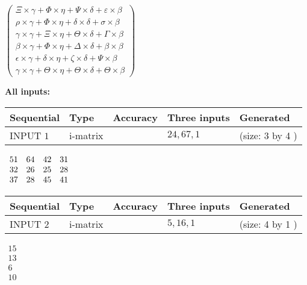 \documentclass[12pt]{article}
\begin{document}
   
 $   \left( \begin{array}
 {
 c
 }
                    \Xi \times  \gamma   +  \Phi \times  \eta   +  \Psi \times  \delta   +  \varepsilon \times  \beta \\ 
 \rho \times  \gamma   +  \Phi \times  \eta   +  \delta \times  \delta   +  \sigma \times  \beta \\ 
 \gamma \times  \gamma   +                     \Xi \times  \eta   +  \Theta \times  \delta   +  \Gamma \times  \beta \\ 
 \beta \times  \gamma   +  \Phi \times  \eta   +  \Delta \times  \delta   +  \beta \times  \beta \\ 
 \epsilon \times  \gamma   +  \delta \times  \eta   +                     \zeta \times  \delta   +  \Psi \times  \beta \\ 
 \gamma \times  \gamma   +  \Theta \times  \eta   +  \Theta \times  \delta   +  \Theta \times  \beta
 \end{array} \right) $ 
   
   
\noindent\vspace{0.1in}\hspace{-0.08in} {\textbf{\Large{All inputs: }}}
   
   
  
  
\noindent\begin{tabular}{|l|l|l|l|l|}
\hline
 Sequential & Type & Accuracy & Three inputs & Generated \\ 
\hline
 
 
  INPUT $  1 $ & i-matrix &  & $
 24
 , 
 67
 , 
 1
 $ & (size:  3  by  4 )
 \\  \hline  
 \end{tabular}
   
   
 $\begin{array}{
 c
 c
 c
 c
 }
 51  & 
 64  & 
 42  & 
 31  \\ 
 32  & 
 26  & 
 25  & 
 28  \\ 
 37  & 
 28  & 
 45  & 
 41
\end{array}  $ 
  
  
\noindent\begin{tabular}{|l|l|l|l|l|}
\hline
 Sequential & Type & Accuracy & Three inputs & Generated \\ 
\hline
 
 
  INPUT $  2 $ & i-matrix &  & $
 5
 , 
 16
 , 
 1
 $ & (size:  4  by  1 )
 \\  \hline  
 \end{tabular}
   
   
 $\begin{array}{
 c
 }
 15  \\ 
 13  \\ 
 6  \\ 
 10
\end{array}  $ 
  
\end{document}
